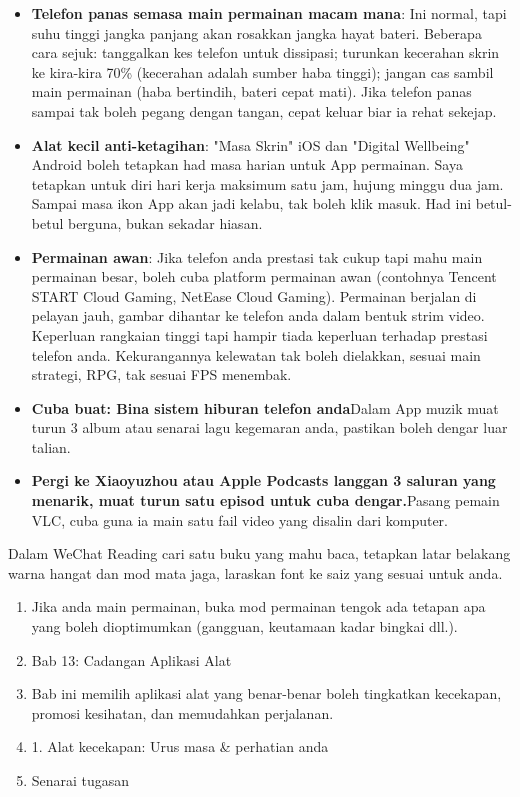 \begin{itemize}
  \item \textbf{Telefon panas semasa main permainan macam mana}: Ini normal, tapi suhu tinggi jangka panjang akan rosakkan jangka hayat bateri. Beberapa cara sejuk: tanggalkan kes telefon untuk dissipasi; turunkan kecerahan skrin ke kira-kira 70\% (kecerahan adalah sumber haba tinggi); jangan cas sambil main permainan (haba bertindih, bateri cepat mati). Jika telefon panas sampai tak boleh pegang dengan tangan, cepat keluar biar ia rehat sekejap.
  \item \textbf{Alat kecil anti-ketagihan}: "Masa Skrin" iOS dan "Digital Wellbeing" Android boleh tetapkan had masa harian untuk App permainan. Saya tetapkan untuk diri hari kerja maksimum satu jam, hujung minggu dua jam. Sampai masa ikon App akan jadi kelabu, tak boleh klik masuk. Had ini betul-betul berguna, bukan sekadar hiasan.
  \item \textbf{Permainan awan}: Jika telefon anda prestasi tak cukup tapi mahu main permainan besar, boleh cuba platform permainan awan (contohnya Tencent START Cloud Gaming, NetEase Cloud Gaming). Permainan berjalan di pelayan jauh, gambar dihantar ke telefon anda dalam bentuk strim video. Keperluan rangkaian tinggi tapi hampir tiada keperluan terhadap prestasi telefon anda. Kekurangannya kelewatan tak boleh dielakkan, sesuai main strategi, RPG, tak sesuai FPS menembak.
  \item \textbf{Cuba buat: Bina sistem hiburan telefon anda}Dalam App muzik muat turun 3 album atau senarai lagu kegemaran anda, pastikan boleh dengar luar talian.
  \item \textbf{Pergi ke Xiaoyuzhou atau Apple Podcasts langgan 3 saluran yang menarik, muat turun satu episod untuk cuba dengar.}Pasang pemain VLC, cuba guna ia main satu fail video yang disalin dari komputer.
\end{itemize}

\begin{tcbpractice}{Dalam WeChat Reading cari satu buku yang mahu baca, tetapkan latar belakang warna hangat dan mod mata jaga, laraskan font ke saiz yang sesuai untuk anda.}
\begin{enumerate}
  \item Jika anda main permainan, buka mod permainan tengok ada tetapan apa yang boleh dioptimumkan (gangguan, keutamaan kadar bingkai dll.).
  \item Bab 13: Cadangan Aplikasi Alat
  \item Bab ini memilih aplikasi alat yang benar-benar boleh tingkatkan kecekapan, promosi kesihatan, dan memudahkan perjalanan.
  \item 1. Alat kecekapan: Urus masa \& perhatian anda
  \item Senarai tugasan
\end{enumerate}

\end{tcbpractice}

